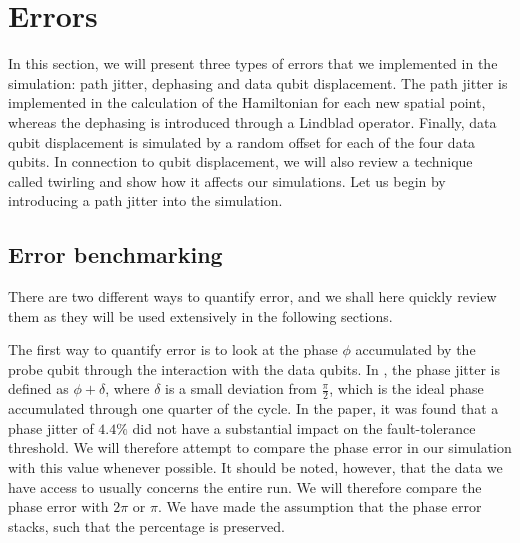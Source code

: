 

\section{Errors}
In this section, we will present three types of errors that we implemented in the simulation: path jitter, dephasing and data qubit displacement. The path jitter is implemented in the calculation of the Hamiltonian for each new spatial point, whereas the dephasing is introduced through a Lindblad operator. Finally, data qubit displacement is simulated by a random offset for each of the four data qubits. In connection to qubit displacement, we will also review a technique called twirling and show how it affects our simulations. Let us begin by introducing a path jitter into the simulation. 


\subsection{Error benchmarking}
There are two different ways to quantify error, and we shall here quickly review them as they will be used extensively in the following sections. 

The first way to quantify error is to look at the phase $\phi$ accumulated by the probe qubit through the interaction with the data qubits. In \cite{the paper}, the phase jitter is defined as $\phi + \delta$, where $\delta$ is a small deviation from $\frac{\pi}{2}$, which is the ideal phase accumulated through one quarter of the cycle. In the paper, it was found that a phase jitter of $4.4 \%$ did not have a substantial impact on the fault-tolerance threshold. We will therefore attempt to compare the phase error in our simulation with this value whenever possible. It should be noted, however, that the data we have access to usually concerns the entire run. We will therefore compare the phase error with $2\pi$ or $\pi$. We have made the assumption that the phase error stacks, such that the percentage is preserved. 


